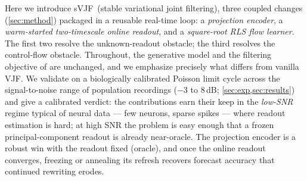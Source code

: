 \documentclass[11pt]{article}
\newcommand{\svjf}{sVJF}
\newcommand{\svjflong}{stable variational joint filtering}
\begin{document}
Here we introduce \svjf\ (\svjflong), three coupled changes (\cref{sec:method}) packaged in a
reusable real-time loop: a \emph{projection encoder}, a \emph{warm-started two-timescale online
readout}, and a \emph{square-root RLS flow learner}. The first two resolve the unknown-readout
obstacle; the third resolves the control-flow obstacle. Throughout, the generative model and the
filtering objective of \autocite{zhao2020variational} are unchanged, and we emphasize precisely
what differs from vanilla VJF. We validate on a biologically calibrated Poisson limit cycle across
the signal-to-noise range of population recordings ($-3$ to $8$\,dB; \cref{sec:exp,sec:results})
and give a calibrated verdict: the contributions earn their keep in the \emph{low-SNR} regime
typical of neural data --- few neurons, sparse spikes --- where readout estimation is hard; at
high SNR the problem is easy enough that a frozen principal-component readout is already
near-oracle. The projection encoder is a robust win with the readout fixed (oracle), and once the online
readout converges, freezing or annealing its refresh recovers forecast accuracy that continued
rewriting erodes.
\end{document}
